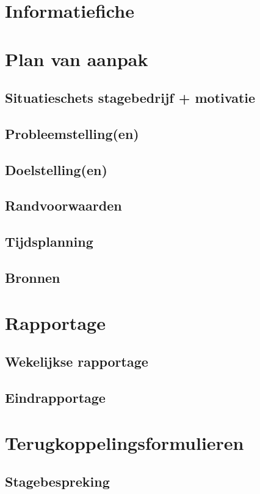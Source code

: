 \documentclass[a4paper]{article}
\begin{document}
  

  \begingroup
    \hypersetup{linkcolor=black}  %
    \tableofcontents
  \endgroup


  \section{Informatiefiche}
  

  \section{Plan van aanpak}
    \subsection{Situatieschets stagebedrijf + motivatie}
    
    \newpage
    \subsection{Probleemstelling(en)}
    
    \newpage
    \subsection{Doelstelling(en)}
    
    \newpage
    \subsection{Randvoorwaarden}
    
    \newpage
    \subsection{Tijdsplanning}
    
    \newpage
    \subsection{Bronnen}
    

  \section{Rapportage}
    \subsection{Wekelijkse rapportage}
    
    \subsection{Eindrapportage}
    

  \section{Terugkoppelingsformulieren}
    \subsection{Stagebespreking}
    
\end{document}
